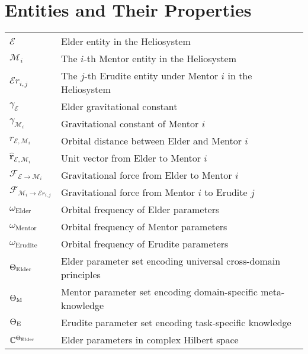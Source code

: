 \section*{Entities and Their Properties}
\vspace{-0.5em}
\begin{tabular}{p{3cm} p{12cm}}
$\mathcal{E}$ & Elder entity in the Heliosystem \\
$\mathcal{M}_i$ & The $i$-th Mentor entity in the Heliosystem \\
$\mathcal{E}r_{i,j}$ & The $j$-th Erudite entity under Mentor $i$ in the Heliosystem \\
$\gamma_{\mathcal{E}}$ & Elder gravitational constant \\
$\gamma_{\mathcal{M}_i}$ & Gravitational constant of Mentor $i$ \\
$r_{\mathcal{E},\mathcal{M}_i}$ & Orbital distance between Elder and Mentor $i$ \\
$\mathbf{\hat{r}}_{\mathcal{E},\mathcal{M}_i}$ & Unit vector from Elder to Mentor $i$ \\
$\mathcal{F}_{\mathcal{E} \rightarrow \mathcal{M}_i}$ & Gravitational force from Elder to Mentor $i$ \\
$\mathcal{F}_{\mathcal{M}_i \rightarrow \mathcal{E}r_{i,j}}$ & Gravitational force from Mentor $i$ to Erudite $j$ \\
$\omega_{\text{Elder}}$ & Orbital frequency of Elder parameters \\
$\omega_{\text{Mentor}}$ & Orbital frequency of Mentor parameters \\
$\omega_{\text{Erudite}}$ & Orbital frequency of Erudite parameters \\
$\Theta_{\text{Elder}}$ & Elder parameter set encoding universal cross-domain principles \\
$\Theta_{\text{M}}$ & Mentor parameter set encoding domain-specific meta-knowledge \\
$\Theta_{\text{E}}$ & Erudite parameter set encoding task-specific knowledge \\
$\mathbb{C}^{\Theta_{\text{Elder}}}$ & Elder parameters in complex Hilbert space \\
\end{tabular}

